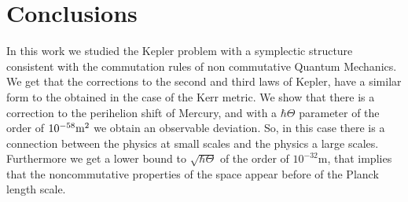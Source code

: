 \documentclass[a4paper,12pt]{article}
\begin{document}
\section{Conclusions}
In this work we studied the Kepler problem with a symplectic
structure consistent with the commutation rules of non commutative
Quantum Mechanics. We get that the corrections to the second and
third laws of Kepler, have a similar form to the obtained in the
case of the Kerr metric. We show that there is a correction to the
perihelion shift of Mercury, and  with a $\hbar\Theta$ parameter
of the order of  $10^{-58}\text m^{2}$ we obtain an observable
deviation. So, in this case there is a connection between the
physics at small scales and the physics a large scales.
Furthermore we get a lower bound to $\sqrt{\hbar\Theta}$ of the
order of $10^{-32}$m, that implies that the noncommutative
properties of the space appear before of the Planck length scale.
\end{document}
